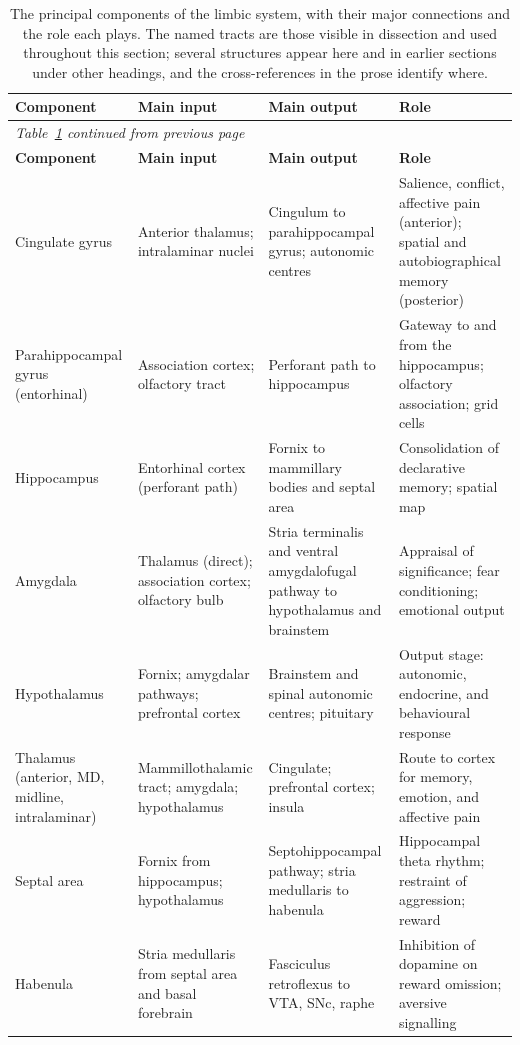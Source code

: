 \documentclass[11pt]{article}
\begin{document}
{\footnotesize
\renewcommand{\arraystretch}{1.3}
\begin{longtable}{p{2.6cm} p{3.2cm} p{3.2cm} p{4.0cm}}
\caption{The principal components of the limbic system, with their major connections and the role each plays. The named tracts are those visible in dissection and used throughout this section; several structures appear here and in earlier sections under other headings, and the cross-references in the prose identify where.}
\label{tab:limbic} \\
\toprule
\textbf{Component} & \textbf{Main input} & \textbf{Main output} & \textbf{Role} \\
\midrule
\endfirsthead
\multicolumn{4}{l}{\emph{\small Table~\ref{tab:limbic} continued from previous page}} \\
\toprule
\textbf{Component} & \textbf{Main input} & \textbf{Main output} & \textbf{Role} \\
\midrule
\endhead
\bottomrule
\endfoot
\bottomrule
\endlastfoot
Cingulate gyrus & Anterior thalamus; intralaminar nuclei & Cingulum to parahippocampal gyrus; autonomic centres & Salience, conflict, affective pain (anterior); spatial and autobiographical memory (posterior) \\
\midrule
Parahippocampal gyrus (entorhinal) & Association cortex; olfactory tract & Perforant path to hippocampus & Gateway to and from the hippocampus; olfactory association; grid cells \\
\midrule
Hippocampus & Entorhinal cortex (perforant path) & Fornix to mammillary bodies and septal area & Consolidation of declarative memory; spatial map \\
\midrule
Amygdala & Thalamus (direct); association cortex; olfactory bulb & Stria terminalis and ventral amygdalofugal pathway to hypothalamus and brainstem & Appraisal of significance; fear conditioning; emotional output \\
\midrule
Hypothalamus & Fornix; amygdalar pathways; prefrontal cortex & Brainstem and spinal autonomic centres; pituitary & Output stage: autonomic, endocrine, and behavioural response \\
\midrule
Thalamus (anterior, MD, midline, intralaminar) & Mammillothalamic tract; amygdala; hypothalamus & Cingulate; prefrontal cortex; insula & Route to cortex for memory, emotion, and affective pain \\
\midrule
Septal area & Fornix from hippocampus; hypothalamus & Septohippocampal pathway; stria medullaris to habenula & Hippocampal theta rhythm; restraint of aggression; reward \\
\midrule
Habenula & Stria medullaris from septal area and basal forebrain & Fasciculus retroflexus to VTA, SNc, raphe & Inhibition of dopamine on reward omission; aversive signalling \\
\end{longtable}
}
\end{document}
